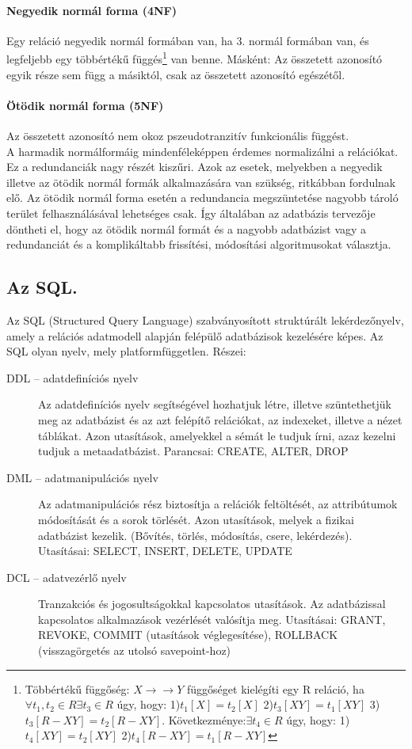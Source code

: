 \paragraph{Negyedik normál forma (4NF)}
Egy reláció negyedik normál formában van, ha 3. normál formában van, és legfeljebb egy többértékű függés\footnote{Többértékű függőség: $X \to\to Y$ függőséget kielégíti egy R reláció, ha $\forall t_1,t_2 \in R \exists t_3 \in R$ úgy, hogy: 1)$t_1[X]=t_2[X]$ 2)$t_3[XY]=t_1[XY]$ 3)$t_3[R-XY]=t_2[R-XY]$. Következménye:$\exists t_4\in R$ úgy, hogy: 1)$t_4[XY]=t_2[XY]$ 2)$t_4[R-XY]=t_1[R-XY]$} van benne. Másként: Az összetett azonosító egyik része sem függ a másiktól, csak az összetett azonosító egészétől.
\paragraph{Ötödik normál forma (5NF)}
Az összetett azonosító nem okoz pszeudotranzitív funkcionális függést.\\

A harmadik normálformáig mindenféleképpen érdemes normalizálni a relációkat. Ez a redundanciák nagy részét kiszűri. Azok az esetek, melyekben a negyedik illetve az ötödik normál formák alkalmazására van szükség, ritkábban fordulnak elő. Az ötödik normál forma esetén a redundancia megszüntetése nagyobb tároló terület felhasználásával lehetséges csak. Így általában az adatbázis tervezője döntheti el, hogy az ötödik normál formát és a nagyobb adatbázist vagy a redundanciát és a komplikáltabb frissítési, módosítási algoritmusokat választja.

\subsection{Az SQL.}
Az SQL (Structured Query Language) szabványosított struktúrált lekérdezőnyelv, amely a relációs adatmodell alapján felépülő adatbázisok kezelésére képes. Az SQL olyan nyelv, mely platformfüggetlen. Részei:
\begin{description}
	\item[DDL -- adatdefiníciós nyelv] Az adatdefiníciós nyelv segítségével hozhatjuk létre, illetve szüntethetjük meg az adatbázist és az azt felépítő relációkat, az indexeket, illetve a nézet táblákat. Azon utasítások, amelyekkel a sémát le tudjuk írni, azaz kezelni tudjuk a metaadatbázist. Parancsai: CREATE, ALTER, DROP
	\item[DML -- adatmanipulációs nyelv] Az adatmanipulációs rész biztosítja a relációk feltöltését, az attribútumok módosítását és a sorok törlését. Azon utasítások, melyek a fizikai adatbázist kezelik. (Bővítés, törlés, módosítás, csere, lekérdezés). Utasításai: SELECT, INSERT, DELETE, UPDATE
	\item[DCL -- adatvezérlő nyelv]	Tranzakciós és jogosultságokkal kapcsolatos utasítások. Az adatbázissal kapcsolatos alkalmazások vezérlését valósítja meg. Utasításai: GRANT, REVOKE, COMMIT (utasítások véglegesítése), ROLLBACK (visszagörgetés az utolsó savepoint-hoz)
\end{description}
